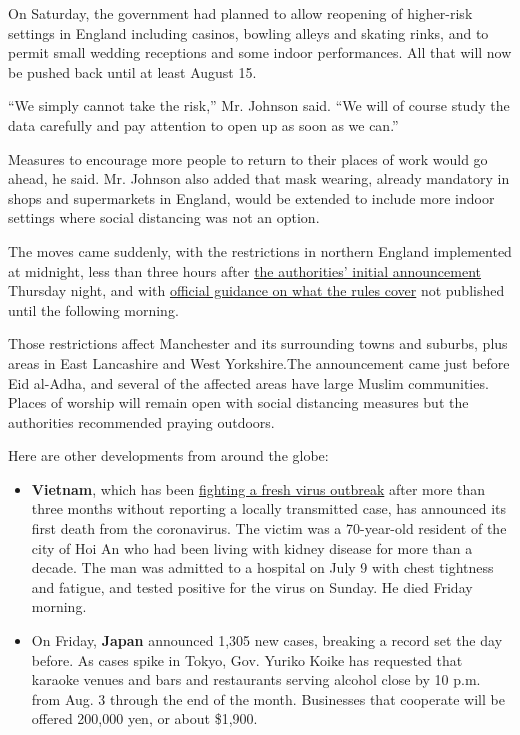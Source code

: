 On Saturday, the government had planned to allow reopening of
higher-risk settings in England including casinos, bowling alleys and
skating rinks, and to permit small wedding receptions and some indoor
performances. All that will now be pushed back until at least August 15.

``We simply cannot take the risk,'' Mr. Johnson said. ``We will of
course study the data carefully and pay attention to open up as soon as
we can.''

Measures to encourage more people to return to their places of work
would go ahead, he said. Mr. Johnson also added that mask wearing,
already mandatory in shops and supermarkets in England, would be
extended to include more indoor settings where social distancing was not
an option.

The moves came suddenly, with the restrictions in northern England
implemented at midnight, less than three hours after
\href{https://twitter.com/MattHancock/status/1288931464168591371}{the
authorities' initial announcement} Thursday night, and with
\href{https://www.gov.uk/guidance/north-west-of-england-local-restrictions-what-you-can-and-cannot-do}{official
guidance on what the rules cover} not published until the following
morning.

Those restrictions affect Manchester and its surrounding towns and
suburbs, plus areas in East Lancashire and West Yorkshire.The
announcement came just before Eid al-Adha, and several of the affected
areas have large Muslim communities. Places of worship will remain open
with social distancing measures but the authorities recommended praying
outdoors.

Here are other developments from around the globe:

\begin{itemize}
\tightlist
\item
  \textbf{Vietnam}, which has been
  \href{https://www.nytimes3xbfgragh.onion/2020/07/29/world/asia/coronavirus-vietnam.html}{fighting
  a fresh virus outbreak} after more than three months without reporting
  a locally transmitted case, has announced its first death from the
  coronavirus. The victim was a 70-year-old resident of the city of Hoi
  An who had been living with kidney disease for more than a decade. The
  man was admitted to a hospital on July 9 with chest tightness and
  fatigue, and tested positive for the virus on Sunday. He died Friday
  morning.
\end{itemize}

\begin{itemize}
\tightlist
\item
  On Friday, \textbf{Japan} announced 1,305 new cases, breaking a record
  set the day before. As cases spike in Tokyo, Gov. Yuriko Koike has
  requested that karaoke venues and bars and restaurants serving alcohol
  close by 10 p.m. from Aug. 3 through the end of the month. Businesses
  that cooperate will be offered 200,000 yen, or about \$1,900.
\end{itemize}

